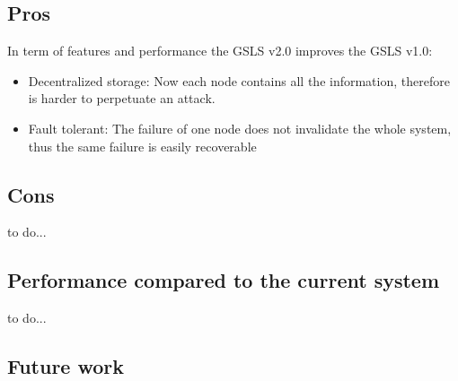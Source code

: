 \subsection{Pros}

In term of features and performance the GSLS v2.0 improves the GSLS v1.0:

\begin{itemize}
    \item{Decentralized storage:} Now each node contains all the information, therefore is harder to perpetuate an attack.
    \item{Fault tolerant:} The failure of one node does not invalidate the whole system, thus the same failure is easily recoverable 
\end{itemize}


\subsection{Cons}

\begin{notation}
    to do... \\
\end{notation}

\subsection{Performance compared to the current system}

\begin{notation}
    to do... \\
\end{notation}

\subsection{Future work}